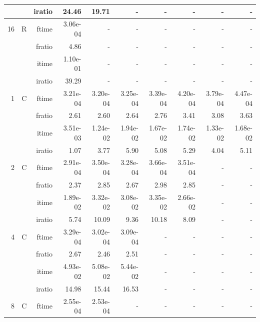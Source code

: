 \documentclass[a4paper]{article}
\begin{document}
\begin{table}[htbp]
\begin{center}
\begin{small}
\begin{tabular}{|r|r|r|r|r|r|r|r|r|r|}
          &      & iratio & 24.46 & 19.71 &     -     &     -     &     -     &     -     &     -     \\ \hline 
     16 & R & ftime & 3.06e-04 &     -     &     -     &     -     &     -     &     -     &     -     \\   
          &      & fratio & 4.86 &     -     &     -     &     -     &     -     &     -     &     -     \\   
          &      & itime & 1.10e-01 &     -     &     -     &     -     &     -     &     -     &     -     \\   
          &      & iratio & 39.29 &     -     &     -     &     -     &     -     &     -     &     -     \\ \hline\hline
     1 & C & ftime & 3.21e-04 & 3.20e-04 & 3.25e-04 & 3.39e-04 & 4.20e-04 & 3.79e-04 & 4.47e-04 \\   
          &      & fratio & 2.61 & 2.60 & 2.64 & 2.76 & 3.41 & 3.08 & 3.63 \\   
          &      & itime & 3.51e-03 & 1.24e-02 & 1.94e-02 & 1.67e-02 & 1.74e-02 & 1.33e-02 & 1.68e-02 \\   
          &      & iratio & 1.07 & 3.77 & 5.90 & 5.08 & 5.29 & 4.04 & 5.11 \\ \hline 
     2 & C & ftime & 2.91e-04 & 3.50e-04 & 3.28e-04 & 3.66e-04 & 3.51e-04 &     -     &     -     \\   
          &      & fratio & 2.37 & 2.85 & 2.67 & 2.98 & 2.85 &     -     &     -     \\   
          &      & itime & 1.89e-02 & 3.32e-02 & 3.08e-02 & 3.35e-02 & 2.66e-02 &     -     &     -     \\   
          &      & iratio & 5.74 & 10.09 & 9.36 & 10.18 & 8.09 &     -     &     -     \\ \hline 
     4 & C & ftime & 3.29e-04 & 3.02e-04 & 3.09e-04 &     -     &     -     &     -     &     -     \\   
          &      & fratio & 2.67 & 2.46 & 2.51 &     -     &     -     &     -     &     -     \\   
          &      & itime & 4.93e-02 & 5.08e-02 & 5.44e-02 &     -     &     -     &     -     &     -     \\   
          &      & iratio & 14.98 & 15.44 & 16.53 &     -     &     -     &     -     &     -     \\ \hline 
     8 & C & ftime & 2.55e-04 & 2.53e-04 &     -     &     -     &     -     &     -     &     -     \\   

\end{tabular}
\end{small}
\end{center}
\end{table}
\end{document}
